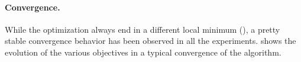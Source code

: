 \paragraph{Convergence.}

While the optimization always end in a different local minimum (), a pretty stable convergence behavior has been observed in all the experiments.  shows the evolution of the various objectives in a typical convergence of the algorithm.







